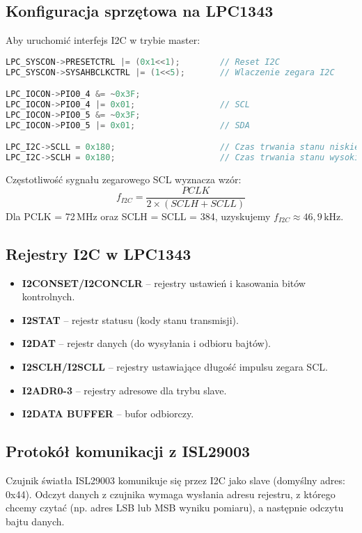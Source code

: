 \documentclass[a4paper,12pt]{report}
\begin{document}
\subsection{Konfiguracja sprzętowa na LPC1343}

Aby uruchomić interfejs I2C w trybie master:
\begin{lstlisting}[language=C]
LPC_SYSCON->PRESETCTRL |= (0x1<<1);        // Reset I2C
LPC_SYSCON->SYSAHBCLKCTRL |= (1<<5);       // Wlaczenie zegara I2C

LPC_IOCON->PIO0_4 &= ~0x3F;
LPC_IOCON->PIO0_4 |= 0x01;                 // SCL
LPC_IOCON->PIO0_5 &= ~0x3F;
LPC_IOCON->PIO0_5 |= 0x01;                 // SDA

LPC_I2C->SCLL = 0x180;                     // Czas trwania stanu niskiego SCL
LPC_I2C->SCLH = 0x180;                     // Czas trwania stanu wysokiego SCL
\end{lstlisting}

Częstotliwość sygnału zegarowego SCL wyznacza wzór:
\[
f_{I2C} = \frac{PCLK}{2 \times (SCLH + SCLL)}
\]
Dla PCLK = 72\,MHz oraz SCLH = SCLL = 384, uzyskujemy \(f_{I2C} \approx 46,9\,\mathrm{kHz}\).

\subsection{Rejestry I2C w LPC1343}

\begin{itemize}
    \item \textbf{I2CONSET/I2CONCLR} – rejestry ustawień i kasowania bitów kontrolnych.
    \item \textbf{I2STAT} – rejestr statusu (kody stanu transmisji).
    \item \textbf{I2DAT} – rejestr danych (do wysyłania i odbioru bajtów).
    \item \textbf{I2SCLH/I2SCLL} – rejestry ustawiające długość impulsu zegara SCL.
    \item \textbf{I2ADR0-3} – rejestry adresowe dla trybu slave.
    \item \textbf{I2DATA BUFFER} – bufor odbiorczy.
\end{itemize}

\subsection{Protokół komunikacji z ISL29003}

Czujnik światła ISL29003 komunikuje się przez I2C jako slave (domyślny adres: 0x44). Odczyt danych z czujnika wymaga wysłania adresu rejestru, z którego chcemy czytać (np. adres LSB lub MSB wyniku pomiaru), a następnie odczytu bajtu danych.
\end{document}
